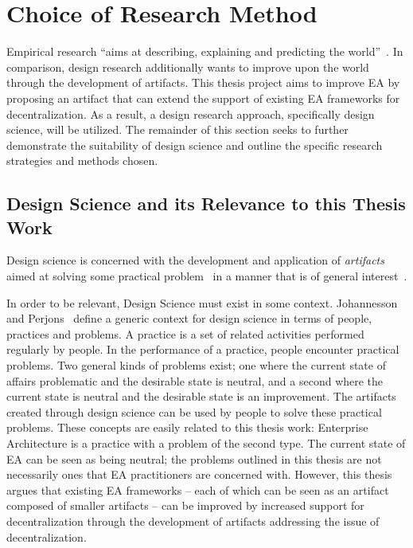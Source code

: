 \section{Choice of Research Method}

Empirical research ``aims at describing, explaining and predicting the world''~\cite[Ch. 1]{johannessonPerjons2012}. In comparison, design research additionally wants to improve upon the world through the development of artifacts. This thesis project aims to improve EA by proposing an artifact that can extend the support of existing EA frameworks for decentralization. As a result, a design research approach, specifically design science, will be utilized. The remainder of this section seeks to further demonstrate the suitability of design science and outline the specific research strategies and methods chosen. 

\subsection{Design Science and its Relevance to this Thesis Work}

Design science is concerned with the development and application of \textit{artifacts} aimed at solving some practical problem~\cite{hevner2004,johannessonPerjons2012} in a manner that is of general interest~\cite[Ch. 1]{johannessonPerjons2012}. 

In order to be relevant, Design Science must exist in some context. Johannesson and Perjons~\cite[Ch. 1]{johannessonPerjons2012} define a generic context for design science in terms of people, practices and problems. A practice is a set of related activities performed regularly by people. In the performance of a practice, people encounter practical problems. Two general kinds of problems exist; one where the current state of affairs problematic and the desirable state is neutral, and a second where the current state is neutral and the desirable state is an improvement. The artifacts created through design science can be used by people to solve these practical problems. These concepts are easily related to this thesis work: Enterprise Architecture is a practice with a problem of the second type.  The current state of EA can be seen as being neutral; the problems outlined in this thesis are not necessarily ones that EA practitioners are concerned with.  However, this thesis argues that existing EA frameworks -- each of which can be seen as an artifact composed of smaller artifacts -- can be improved by increased support for decentralization through the development of artifacts addressing the issue of decentralization. 

